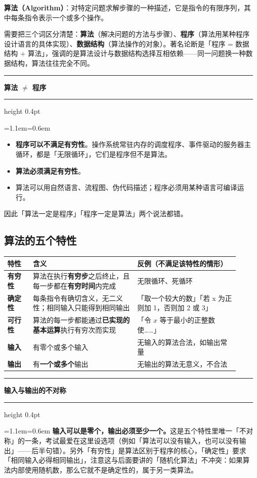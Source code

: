 \documentclass[11pt,openany,UTF8]{ctexbook}
\newcommand{\callouthead}[2]{%
  \par\addvspace{7pt}\noindent
  {\color{#1}\rule[-0.15em]{3pt}{1.05em}}\hspace{0.5em}%
  {\bfseries\color{#1}#2}\par\nobreak\vspace{-0.35em}%
  {\color{rulesep}\hrule height 0.4pt}\nobreak\vspace{0.45em}%
  \begingroup\small\setlength{\parindent}{0pt}%
  \leftskip=1.1em\rightskip=0.6em\noindent\ignorespaces}
\newcommand{\calloutend}{\par\endgroup\addvspace{7pt}}
\newenvironment{callkey}[1]{\callouthead{keybar}{#1}}{\calloutend}
\newenvironment{callwarn}[1]{\callouthead{warnbar}{#1}}{\calloutend}
\begin{document}
\textbf{算法（Algorithm）}：对特定问题求解步骤的一种描述，它是指令的有限序列，其中每条指令表示一个或多个操作。

需要把三个词区分清楚：\textbf{算法}（解决问题的方法与步骤）、\textbf{程序}（算法用某种程序设计语言的具体实现）、\textbf{数据结构}（算法操作的对象）。著名论断是「程序 = 数据结构 + 算法」，强调的是算法设计与数据结构选择互相依赖——同一问题换一种数据结构，算法往往完全不同。

\begin{callwarn}{算法 $\neq$ 程序}
\begin{itemize}
\item \textbf{程序可以不满足有穷性}。操作系统常驻内存的调度程序、事件驱动的服务器主循环，都是「无限循环」，它们是程序但不是算法。
\item \textbf{算法必须满足有穷性}。
\item 算法可以用自然语言、流程图、伪代码描述；程序必须用某种语言可编译运行。
\end{itemize}
因此「算法一定是程序」「程序一定是算法」两个说法都错。

\end{callwarn}

\subsection{算法的五个特性}

\begingroup\small\setlength{\tabcolsep}{4.0pt}
\begin{longtable}{@{}L{0.1032\linewidth}L{0.4170\linewidth}L{0.4084\linewidth}@{}}
\toprule
\textbf{特性} & \textbf{含义} & \textbf{反例（不满足该特性的情形）} \\
\midrule
\endhead
\textbf{有穷性} & 算法在执行\textbf{有穷步}之后终止，且每一步都在\textbf{有穷时间}内完成 & 无限循环、死循环 \\
\textbf{确定性} & 每条指令有确切含义，无二义性；相同输入只能得到相同输出 & 「取一个较大的数」「若 x 为正则加 1，否则加 2 或 3」 \\
\textbf{可行性} & 算法的每一步都能通过\textbf{已实现的基本运算}执行有穷次而实现 & 「令 $x$ 等于最小的正整数使……」 \\
\textbf{输入} & 有零个或多个输入 & 无输入的算法合法，如输出常量 \\
\textbf{输出} & 有\textbf{一个或多个}输出 & 无输出的算法无意义，不合法 \\
\bottomrule
\end{longtable}
\endgroup

\begin{callkey}{输入与输出的不对称}
\textbf{输入可以是零个，输出必须至少一个。}这是五个特性里唯一「不对称」的一条，考试最爱在这里设选项（例如「算法可以没有输入，也可以没有输出」——后半句错）。另外「有穷性」是算法区别于程序的核心，「确定性」要求「相同输入必得相同输出」，注意这与后面要讲的「随机化算法」不冲突：如果算法内部使用随机数，那么它就不是确定性的，属于另一类算法。

\end{callkey}
\end{document}
